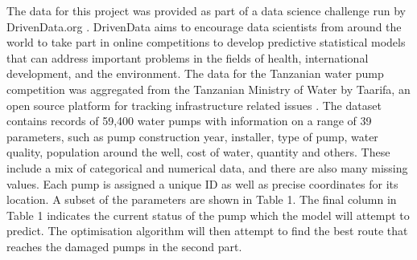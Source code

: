 \documentclass{article} %
\begin{document}
\begin{multicols}{2}
The data for this project was provided as part of a data science challenge run by DrivenData.org \cite{DrivenData2015}. DrivenData aims to encourage data scientists from around the world to take part in online competitions to develop predictive statistical models that can address important problems in the fields of health, international development, and the environment. The data for the Tanzanian water pump competition was aggregated from the Tanzanian Ministry of Water by Taarifa, an open source platform for tracking infrastructure related issues \cite{Taarifa2015}.  The dataset contains records of 59,400 water pumps with information on a range of 39 parameters, such as pump construction year, installer, type of pump, water quality, population around the well, cost of water, quantity and others. These include a mix of categorical and numerical data, and there are also many missing values. Each pump is assigned a unique ID as well as precise coordinates for its location. A subset of the parameters are shown in Table 1. The final column in Table 1 indicates the current status of the pump which the model will attempt to predict. The optimisation algorithm will then attempt to find the best route that reaches the damaged pumps in the second part.


\begin{table}[H]
\caption{Sample of the DrivenData Tanzania water wells dataset}
\centering
{}
\end{table}


\end{multicols}
\end{document}
